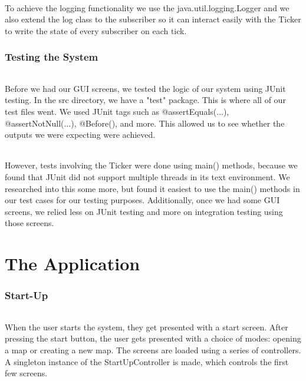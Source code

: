 \documentclass[a4paper,11pt,titlepage]{article}
\begin{document}
\paragraph{}
To achieve the logging functionality we use the java.util.logging.Logger and we also extend the log class to the subscriber so it can interact easily with the Ticker to write the state of every subscriber on each tick.

\section{Testing the System}
\paragraph{}
Before we had our GUI screens, we tested the logic of our system using JUnit testing. In the src directory, we have a "test" package. This is where all of our test files went. We used JUnit tags such as @assertEquals(...), @assertNotNull(...), @Before(), and more. This allowed us to see whether the outputs we were expecting were achieved. 
\paragraph{}
However, tests involving the Ticker were done using main() methods, because we found that JUnit did not support multiple threads in its text environment. We researched into this some more, but found it easiest to use the main() methods in our test cases for our testing purposes. Additionally, once we had some GUI screens, we relied less on JUnit testing and more on integration testing using those screens.

\part{The Application}
\section{Start-Up}
\paragraph{}
When the user starts the system, they get presented with a start screen. After pressing the start button, the user gets presented with a choice of modes: opening a map or creating a new map. The screens are loaded using a series of controllers. A singleton instance of the StartUpController is made, which controls the first few screens.
\end{document}
